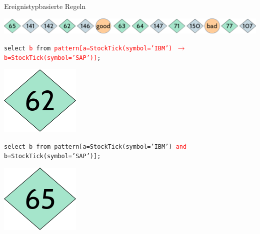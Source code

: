 \documentclass[usenames,dvipsnames]{beamer}
\begin{document}
\begin{frame}{Ereignistypbasierte Regeln}
\begin{center}
    \includegraphics[scale=0.4]{img/stream-2}
\end{center}

\begin{exampleblock}{}
    \begin{center}
    \texttt{select \textcolor{red}{b} from 
    \textcolor{red}{pattern[a=StockTick(symbol='IBM') $\rightarrow$ 
    b=StockTick(symbol='SAP')]};}
\end{center}
\end{exampleblock}
\begin{center}
    \includegraphics[scale=0.25]{img/solution-a}
\end{center}

\begin{exampleblock}{}
\begin{center}
    \texttt{select b from pattern[a=StockTick(symbol='IBM') \textcolor{red}{and} 
    b=StockTick(symbol='SAP')];}
\end{center}
\end{exampleblock}
\begin{center}
    \includegraphics[scale=0.25]{img/solution-b}
\end{center}
\end{frame}
\end{document}
